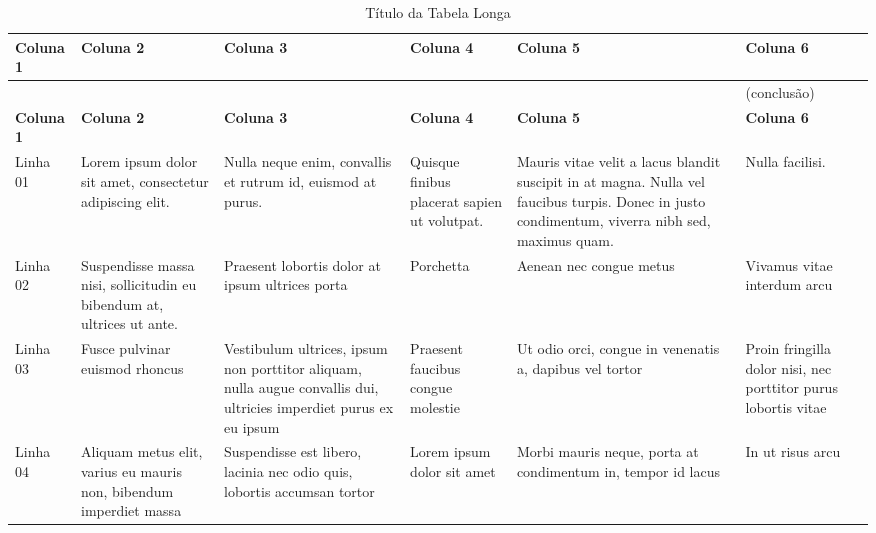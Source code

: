 {\footnotesize
	\centering
	\begin{longtable}{ M{.10\textwidth}  M{.15\textwidth}  M{.16\textwidth}  M{.15\textwidth}  M{.16\textwidth}  M{.12\textwidth} }
		
		\caption{Título da Tabela Longa} 
		\label{tabela:longa}\\
		\toprule
		
		\textbf{Coluna 1} & \textbf{Coluna 2} & \textbf{Coluna 3} & \textbf{Coluna 4} & \textbf{Coluna 5} & \textbf{Coluna 6} \\ %
		
		\hline 
		
		\endfirsthead
		& & & & & \null \hfill(conclusão)\\ 
		
		\toprule
		
		\textbf{Coluna 1} & \textbf{Coluna 2} & \textbf{Coluna 3} & \textbf{Coluna 4} & \textbf{Coluna 5} & \textbf{Coluna 6} \\ %
		
		\hline %
		
		\endhead
		
		Linha 01 & Lorem ipsum dolor sit amet, consectetur adipiscing elit. & Nulla neque enim, convallis et rutrum id, euismod at purus. &  Quisque finibus placerat sapien ut volutpat.  & Mauris vitae velit a lacus blandit suscipit in at magna. Nulla vel faucibus turpis. Donec in justo condimentum, viverra nibh sed, maximus quam. & Nulla facilisi. \\
		
		Linha 02 & Suspendisse massa nisi, sollicitudin eu bibendum at, ultrices ut ante. & Praesent lobortis dolor at ipsum ultrices porta &  Porchetta & Aenean nec congue metus & Vivamus vitae interdum arcu \\
		
		Linha 03 & Fusce pulvinar euismod rhoncus & Vestibulum ultrices, ipsum non porttitor aliquam, nulla augue convallis dui, ultricies imperdiet purus ex eu ipsum &  Praesent faucibus congue molestie & Ut odio orci, congue in venenatis a, dapibus vel tortor & Proin fringilla dolor nisi, nec porttitor purus lobortis vitae \\
		
		Linha 04 & Aliquam metus elit, varius eu mauris non, bibendum imperdiet massa & Suspendisse est libero, lacinia nec odio quis, lobortis accumsan tortor &  Lorem ipsum dolor sit amet & Morbi mauris neque, porta at condimentum in, tempor id lacus & In ut risus arcu \\
		

\end{longtable}}
